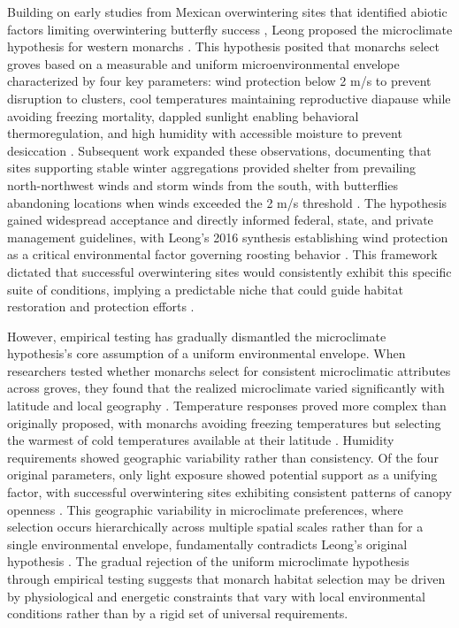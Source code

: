 Building on early studies from Mexican overwintering sites that identified abiotic factors limiting overwintering butterfly success \citep{andersonFreezeprotectionOverwinteringMonarch1996,calvertEffectRainSnow1983}, Leong proposed the microclimate hypothesis for western monarchs \citep{leongMicroenvironmentalFactorsAssociated1990}. This hypothesis posited that monarchs select groves based on a measurable and uniform microenvironmental envelope characterized by four key parameters: wind protection below 2 m/s to prevent disruption to clusters, cool temperatures maintaining reproductive diapause while avoiding freezing mortality, dappled sunlight enabling behavioral thermoregulation, and high humidity with accessible moisture to prevent desiccation \citep{leongMicroenvironmentalFactorsAssociated1990}. Subsequent work expanded these observations, documenting that sites supporting stable winter aggregations provided shelter from prevailing north-northwest winds and storm winds from the south, with butterflies abandoning locations when winds exceeded the 2 m/s threshold \citep{leongUseMultivariateAnalyses1991,leong2004analysis}. The hypothesis gained widespread acceptance and directly informed federal, state, and private management guidelines, with Leong's 2016 synthesis establishing wind protection as a critical environmental factor governing roosting behavior \citep{leongEvaluationManagementCalifornia2016}. This framework dictated that successful overwintering sites would consistently exhibit this specific suite of conditions, implying a predictable niche that could guide habitat restoration and protection efforts \citep{xercessocietyStateMonarchOverwintering2016}.

However, empirical testing has gradually dismantled the microclimate hypothesis's core assumption of a uniform environmental envelope. When researchers tested whether monarchs select for consistent microclimatic attributes across groves, they found that the realized microclimate varied significantly with latitude and local geography \citep{sanieeHierarchyScaleInfluence2022}. Temperature responses proved more complex than originally proposed, with monarchs avoiding freezing temperatures but selecting the warmest of cold temperatures available at their latitude \citep{fisherClimaticNicheModel2018}. Humidity requirements showed geographic variability rather than consistency. Of the four original parameters, only light exposure showed potential support as a unifying factor, with successful overwintering sites exhibiting consistent patterns of canopy openness \citep{sanieeHierarchyScaleInfluence2022}. This geographic variability in microclimate preferences, where selection occurs hierarchically across multiple spatial scales rather than for a single environmental envelope, fundamentally contradicts Leong's original hypothesis \citep{fisherClimaticNicheModel2018,sanieeHierarchyScaleInfluence2022}. The gradual rejection of the uniform microclimate hypothesis through empirical testing suggests that monarch habitat selection may be driven by physiological and energetic constraints that vary with local environmental conditions rather than by a rigid set of universal requirements.

